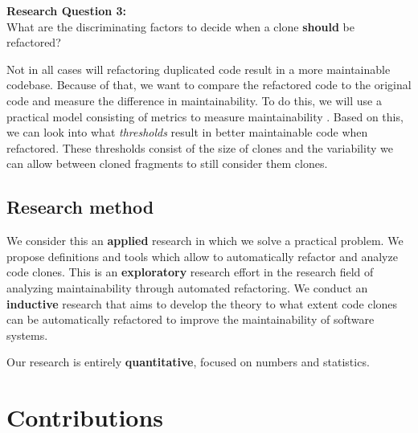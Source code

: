 \begin{displayquote}
\textbf{Research Question 3:}\\What are the discriminating factors to decide when a clone \textbf{should} be refactored?
\end{displayquote}
Not in all cases will refactoring duplicated code result in a more maintainable codebase. Because of that, we want to compare the refactored code to the original code and measure the difference in maintainability. To do this, we will use a practical model consisting of metrics to measure maintainability \cite{heitlager2007practical}. Based on this, we can look into what \textit{thresholds} result in better maintainable code when refactored. These thresholds consist of the size of clones and the variability we can allow between cloned fragments to still consider them clones.

\subsection{Research method}
We consider this an \textbf{applied} research in which we solve a practical problem. We propose definitions and tools which allow to automatically refactor and analyze code clones. This is an \textbf{exploratory} research effort in the research field of analyzing maintainability through automated refactoring. We conduct an \textbf{inductive} research that aims to develop the theory to what extent code clones can be automatically refactored to improve the maintainability of software systems.

Our research is entirely \textbf{quantitative}, focused on numbers and statistics.

\section{Contributions}

